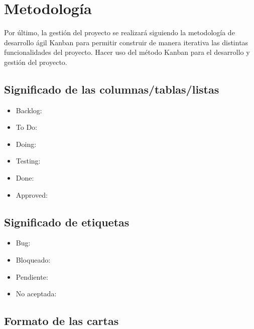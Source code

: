 \section{Metodología}
Por último, la gestión del proyecto se realizará siguiendo la metodología de desarrollo ágil Kanban para permitir construir de manera iterativa las distintas funcionalidades del proyecto.
Hacer uso del método Kanban para el desarrollo y gestión del proyecto.

\subsection{Significado de las columnas/tablas/listas}
\begin{itemize}
    \item Backlog:
    \item To Do:
    \item Doing:
    \item Testing:
    \item Done:
    \item Approved:
\end{itemize}

\subsection{Significado de etiquetas}
\begin{itemize}
    \item Bug:
    \item Bloqueado:
    \item Pendiente:
    \item No aceptada:
\end{itemize}

\subsection{Formato de las cartas}
